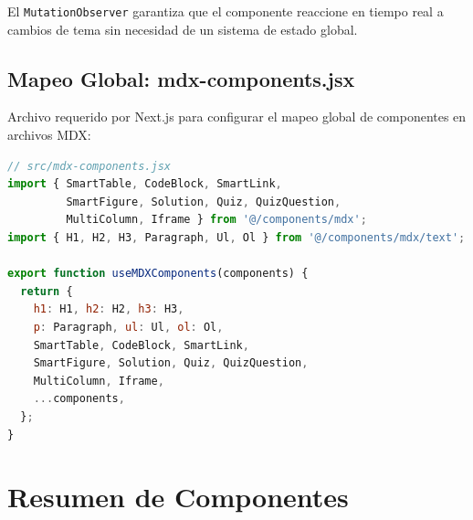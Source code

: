 \documentclass[12pt,a4paper]{article}
\begin{document}
El \texttt{MutationObserver} garantiza que el componente reaccione en tiempo real a cambios de tema sin necesidad de un sistema de estado global.

\subsection{Mapeo Global: mdx-components.jsx}

Archivo requerido por Next.js para configurar el mapeo global de componentes en archivos MDX:

\begin{lstlisting}[language=JavaScript]
// src/mdx-components.jsx
import { SmartTable, CodeBlock, SmartLink,
         SmartFigure, Solution, Quiz, QuizQuestion,
         MultiColumn, Iframe } from '@/components/mdx';
import { H1, H2, H3, Paragraph, Ul, Ol } from '@/components/mdx/text';

export function useMDXComponents(components) {
  return {
    h1: H1, h2: H2, h3: H3,
    p: Paragraph, ul: Ul, ol: Ol,
    SmartTable, CodeBlock, SmartLink,
    SmartFigure, Solution, Quiz, QuizQuestion,
    MultiColumn, Iframe,
    ...components,
  };
}
\end{lstlisting}

\section{Resumen de Componentes}
\end{document}
